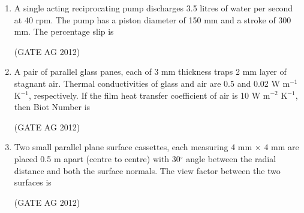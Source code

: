 \documentclass[journal]{IEEEtran}
\begin{document}
\begin{enumerate}
\medskip

\item
 A single acting reciprocating pump discharges 3.5 litres of water per second at 40 rpm. The pump has a piston diameter of 150 mm and a stroke of 300 mm. The percentage slip is
\begin{enumerate}
\end{enumerate}
\hfill(GATE AG 2012)\\

\medskip

\item
 A pair of parallel glass panes, each of 3 mm thickness traps 2 mm layer of stagnant air. Thermal conductivities of glass and air are 0.5 and 0.02 W m$^{-1}$ K$^{-1}$, respectively. If the film heat transfer coefficient of air is 10 W m$^{-2}$ K$^{-1}$, then Biot Number is
\begin{enumerate}
\end{enumerate}
\hfill(GATE AG 2012)\\

\medskip

\item
 Two small parallel plane surface cassettes, each measuring 4 mm $\times$ 4 mm are placed 0.5 m apart (centre to centre) with 30$^{\circ}$ angle between the radial distance and both the surface normals. The view factor between the two surfaces is
\begin{enumerate}
\end{enumerate}
\hfill(GATE AG 2012)\\


\end{enumerate}
\end{document}
